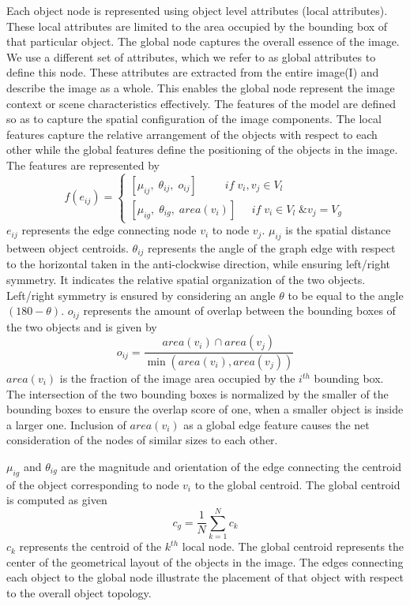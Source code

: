 \documentclass[10pt,twocolumn,letterpaper]{article}
\begin{document}
Each object node is represented using object level attributes (local attributes). These local attributes are limited to the area occupied by the bounding box of that particular object. The global node captures the overall essence of the image. We use a different set of attributes, which we refer to as global attributes to define this node. These attributes are extracted 
from the entire image(I) and describe the image as a whole. This enables the global node represent the image context or scene characteristics effectively.
The features of the model are defined so as to capture the spatial configuration of the image components. The local features capture the relative arrangement of the objects with respect to each other while the global
features define the positioning of the objects in the image. The features are represented by 
\[f({e_{ij}}) = \left\{ {\begin{array}{*{20}{c}}
	{[{\mu _{ij}},\;{\theta _{ij}},\;{o_{ij}}]\;\;\;\;\;\;\;\;\;if\;{v_i},{v_j} \in {V_l}}\\
	{[{\mu _{ig}},\;{\theta _{ig}},\;area({v_i})]\;\;\;\;\;if\;{v_i} \in {V_l}\;\& {v_j} = {V_g}}
	\end{array}} \right.\]
$e_{ij}$ represents the edge connecting node $v_i$ to node $v_j$. $\mu_{ij}$ is the spatial distance between object centroids. $\theta_{ij}$ represents the angle of the graph edge with respect to the horizontal taken in the anti-clockwise direction, while ensuring left/right symmetry. It indicates the relative spatial organization of the two objects. Left/right symmetry is ensured by considering an angle $\theta$ to be equal to the angle $(180-\theta)$. $o_{ij}$ represents the amount of overlap between the bounding boxes of the two objects and is given by 
\[{o_{ij}} = \frac{{area({v_i}) \cap area({v_j})}}{{\min (area({v_i}),area({v_j}))}}\]
${area({v_i})}$ is the fraction of the image area occupied by the ${i^{th}}$ bounding box.
The intersection of the two bounding boxes is normalized by the smaller of the bounding boxes to ensure the overlap score of one, when a smaller object is inside a larger one. Inclusion of $area({v_i})$ as a global edge feature causes the net consideration of the nodes of similar sizes to each other.

$\mu_{ig}$ and $\theta_{ig}$ are the magnitude and orientation of the edge connecting the centroid of the object corresponding to node $v_i$ to the global centroid. The global centroid is computed as given 
\[{c_g} = \frac{1}{N}\sum\limits_{k = 1}^N {{c_k}} \]
$c_k$ represents the centroid of the $k^{th}$ local node. The global centroid represents the center of the geometrical layout of the objects in the image. The edges connecting each object to the global node illustrate the placement of that object with respect to the overall object topology.
\end{document}
